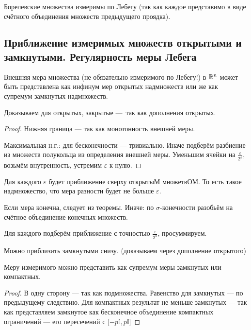 \documentclass[12pt, a4paper, oneside]{memoir}
\begin{document}
\begin{corollary}
    Борелевские множества измеримы по Лебегу
    (так как каждое представимо в виде счётного объединения множеств предыдущего проядка).
\end{corollary}


\subsection{Приближение измеримых множеств открытыми и замкнутыми.
Регулярность меры Лебега}

\begin{theorem}
    Внешняя мера множества (не обязательно измеримого по Лебегу!) в ${\mathbb{R}}^n$ может быть представлена
    как инфинум мер открытых надмножеств
    или же как супремум замкнутых надмножеств.

    Доказываем для открытых, закрытые — так как дополнения открытых.

    \begin{proof}
        Нижняя граница — так как монотонность внешней меры.
        
        Максимальная н.г.: для бесконечности — тривиально.
        Иначе подберём разбиение из множеств полукольца из определения внешней меры.
        Уменьшим ячейки на $\frac{\varepsilon}{2^k}$, возьмём внутренность, устремим $\varepsilon$ к нулю.
    \end{proof}
\end{theorem}

\begin{corollary}
    Для каждого $\varepsilon$ будет приближение сверху открытыМ множетвОМ.
    То есть такое надмножество, что мера разности будет не больше $\varepsilon$.

    Если мера конечна, следует из теоремы. Иначе: по $\sigma$-конечности разобьём на счётное объединение конечных множеств.

    Для каждого подберём приближение с точностью $\frac{\varepsilon}{2^k}$, просуммируем.
\end{corollary}



\begin{corollary}
    Можно приблизить замкнутыми снизу. (доказываем через дополнение открытого)
\end{corollary}

\begin{corollary}
    Меру измеримого можно представить как супремум меры замкнутых или компактных.

    \begin{proof}
        В одну сторону — так как подмножества. Равенство для замкнутых — по предыдущему следствию.
        Для компактных результат не меньше замкнутых —
        так как представляем замкнутое как бесконечное объединение компактных ограничений
        — его пересечений с [$-p \mathbb{I}, p \mathbb{I}$]
    \end{proof}
\end{corollary}
\end{document}
